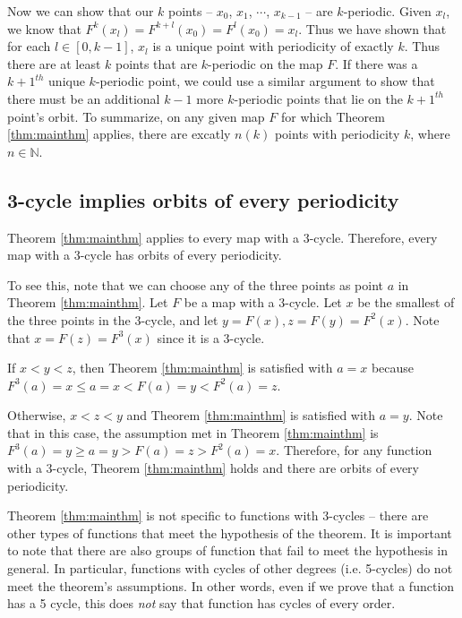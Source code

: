 \documentclass[12pt]{IEEEtran}
\begin{document}
Now we can show that our $k$ points -- $x_0$, $x_1$, $\cdots$, $x_{k-1}$ -- are $k$-periodic. Given $x_l$, we know that $F^k \left( x_l \right) = F^{k+l} \left ( x_0 \right) = F^{l} \left ( x_0 \right) = x_l$. Thus we have shown that for each $l \in [0,k-1]$, $x_l$ is a unique point with periodicity of exactly $k$. Thus there are at least $k$ points that are $k$-periodic on the map $F$. If there was a $k+1^{th}$ unique $k$-periodic point, we could use a similar argument to show that there must be an additional $k-1$ more $k$-periodic points that lie on the $k+1^{th}$ point's orbit. To summarize, on any given map $F$ for which Theorem \ref{thm:mainthm} applies, there are excatly $n \left( k \right)$ points with periodicity $k$, where $n \in \mathbb{N}$.



\subsection{ 3-cycle implies orbits of every periodicity}
Theorem \ref{thm:mainthm} applies to every map with a 3-cycle. Therefore, every map with a 3-cycle has orbits of every periodicity.

To see this, note that we can choose any of the three points as point $a$ in Theorem \ref{thm:mainthm}. Let $F$ be a map with a 3-cycle. Let $x$ be the smallest of the three points in the 3-cycle, and let $y = F \left( x \right), z = F \left( y \right) = F^2 \left( x \right)$. Note that $x = F \left( z \right) = F^3 \left( x \right)$ since it is a 3-cycle.

If $ x < y < z$, then Theorem \ref{thm:mainthm} is satisfied with $a=x$ because $F^3\left(a\right)=x \leq a=x < F\left(a\right)=y < F^2\left(a\right)=z$.

Otherwise, $x < z < y$ and Theorem \ref{thm:mainthm} is satisfied with $a=y$. Note that in this case, the assumption met in Theorem \ref{thm:mainthm} is $F^3\left(a\right)=y \geq a=y > F\left(a\right)=z > F^2\left(a\right)=x$. Therefore, for any function with a 3-cycle, Theorem \ref{thm:mainthm} holds and there are orbits of every periodicity.

Theorem \ref{thm:mainthm} is not specific to functions with 3-cycles -- there are other types of functions that meet the hypothesis of the theorem. It is important to note that there are also groups of function that fail to meet the hypothesis in general. In particular, functions with cycles of other degrees (i.e. 5-cycles) do not meet the theorem's assumptions. In other words, even if we prove that a function has a 5 cycle, this does {\it not} say that function has cycles of every order.
\end{document}
